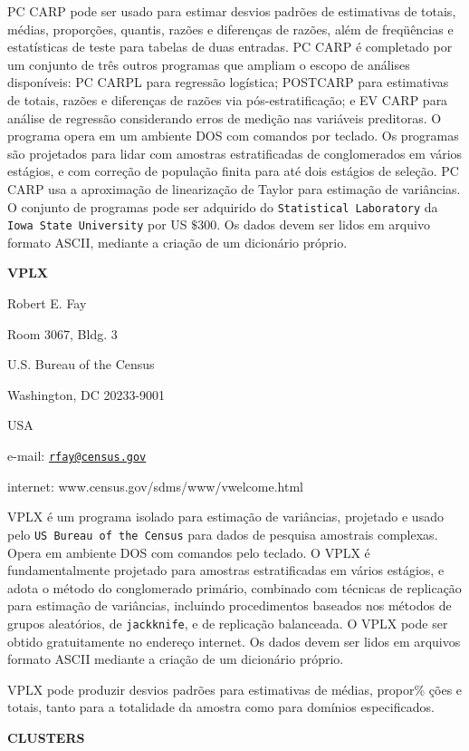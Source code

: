 \documentclass[]{book}
\numberwithin{example}{chapter}
\numberwithin{remark}{chapter}
\numberwithin{definition}{chapter}
\begin{document}
PC CARP pode ser usado para estimar desvios padrões de estimativas de
totais, médias, proporções, quantis, razões e diferenças de razões, além
de freqüências e estatísticas de teste para tabelas de duas entradas. PC
CARP é completado por um conjunto de três outros programas que ampliam o
escopo de análises disponíveis: PC CARPL para regressão logística;
POSTCARP para estimativas de totais, razões e diferenças de razões via
pós-estratificação; e EV CARP para análise de regressão considerando
erros de medição nas variáveis preditoras. O programa opera em um
ambiente DOS com comandos por teclado. Os programas são projetados para
lidar com amostras estratificadas de conglomerados em vários estágios, e
com correção de população finita para até dois estágios de seleção. PC
CARP usa a aproximação de linearização de Taylor para estimação de
variâncias. O conjunto de programas pode ser adquirido do
\texttt{Statistical\ Laboratory} da \texttt{Iowa\ State\ University} por
US \(\$300\). Os dados devem ser lidos em arquivo formato ASCII,
mediante a criação de um dicionário próprio.

\textbf{VPLX}

Robert E. Fay

Room 3067, Bldg. 3

U.S. Bureau of the Census

Washington, DC 20233-9001

USA

e-mail: \href{mailto:rfay@census.gov}{\nolinkurl{rfay@census.gov}}

internet: www.census.gov/sdms/www/vwelcome.html

VPLX é um programa isolado para estimação de variâncias, projetado e
usado pelo \texttt{US\ Bureau\ of\ the\ Census} para dados de pesquisa
amostrais complexas. Opera em ambiente DOS com comandos pelo teclado. O
VPLX é fundamentalmente projetado para amostras estratificadas em vários
estágios, e adota o método do conglomerado primário, combinado com
técnicas de replicação para estimação de variâncias, incluindo
procedimentos baseados nos métodos de grupos aleatórios, de
\texttt{jackknife}, e de replicação balanceada. O VPLX pode ser obtido
gratuitamente no endereço internet. Os dados devem ser lidos em arquivos
formato ASCII mediante a criação de um dicionário próprio.

VPLX pode produzir desvios padrões para estimativas de médias, propor\%
ções e totais, tanto para a totalidade da amostra como para domínios
especificados.

\textbf{CLUSTERS}
\end{document}
